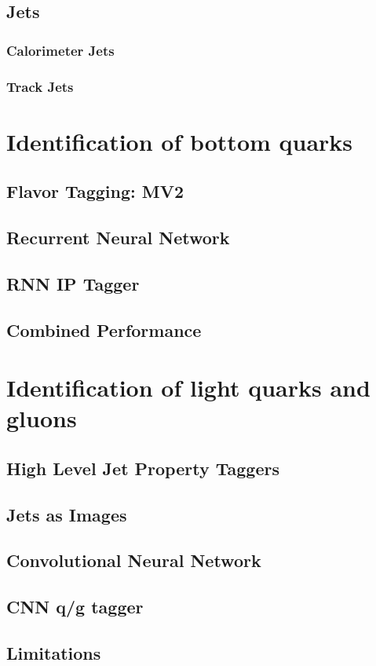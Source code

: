 \section{Jets}
\subsection{Calorimeter Jets}
\subsection{Track Jets}

\chapter{Identification of bottom quarks}
\section{Flavor Tagging: MV2}
\section{Recurrent Neural Network}
\section{RNN IP Tagger}
\section{Combined Performance}

\chapter{Identification of light quarks and gluons}
\section{High Level Jet Property Taggers}
\section{Jets as Images}
\section{Convolutional Neural Network}
\section{CNN q/g tagger}
\section{Limitations}

